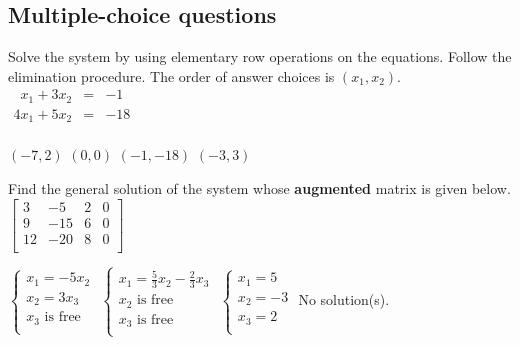 \documentclass[11pt]{exam}
\begin{document}
\begin{questions}

  \section{Multiple-choice questions}
  \addpoints
  \question[2]
  Solve the system by using elementary row operations on the equations. \newline Follow the elimination procedure. The order of answer choices is $(x_{1},x_{2}).$\newline
  $ \begin{array}{ccc}\phantom{3}x_{1}+3x_{2} & = & -1 \\ 4x_{1}+5x_{2} & = & -18 \\ \end{array} $

\begin{oneparchoices}
\choice $(-7,2)$ %
\choice $(0,0)$
\choice $(-1,-18)$
\choice $(-3,3)$
\end{oneparchoices}
\answerline

\addpoints
\question[2]
Find the general solution of the system whose \textbf{augmented} matrix is given below. \newline $\left[ \begin{array}{cccc} 3 & -5 & 2 & 0 \\ 9 & -15 & 6 & 0 \\ 12 & -20 & 8 & 0 \\ \end{array}  \right]$

\begin{oneparchoices}
\choice $\left\{ \begin{array}{l} x_{1} = -5 x_{2} \\ x_{2} = 3x_{3} \\ x_{3} \text{ is free} \\ \end{array} \right.$
\choice $\left\{ \begin{array}{l} x_{1} = \frac{5}{3} x_{2} - \frac{2}{3} x_{3}\\ x_{2} \text{ is free} \\ x_{3} \text{ is free} \\ \end{array} \right.$ %
\choice $\left\{ \begin{array}{l} x_{1} = 5 \\ x_{2} = -3 \\ x_{3}=2 \\ \end{array} \right.$
\choice No solution(s).
\end{oneparchoices}
\answerline


\end{questions}
\end{document}
